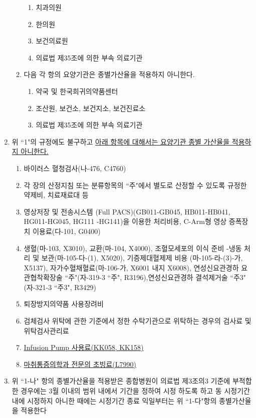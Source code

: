 \begin{enumerate}[1.]
\begin{enumerate}[가.]
\begin{enumerate}[(1)]
		\item 치과의원
		\item 한의원
		\item 보건의료원
		\item 의료법 제35조에 의한 부속 의료기관
		\end{enumerate}		
	\item 다음 각 항의 요양기관은 종별가산율을 적용하지 아니한다.
		\begin{enumerate}[(1)]\tightlist
		\item 약국 및 한국희귀의약품센터 
		\item 조산원, 보건소, 보건지소, 보건진료소
		\item 의료법 제35조에 의한 부속 의료기관
		\end{enumerate}
	\end{enumerate}
\item 위 “1"의 규정에도 불구하고 \uline{아래 항목에 대해서는 요양기관 종별 가산율을 적용하지 아니한다.}
	\begin{enumerate}[가.]\tightlist
	\item 바이러스 혈청검사(나-476, C4760)
	\item 각 장의 산정지침 또는 분류항목의 “주"에서 별도로 산정할 수 있도록 규정한 약제비, 치료재료대 등
	\item 영상저장 및 전송시스템 (Full PACS)(GB011-GB045, HB011-HB041, HG011-HG045, HG111 -HG141)을 이용한 처리비용, C-Arm형 영상 증폭장치 이용료(다-101, G0400)
	\item 생혈(마-103, X3010), 교환(마-104, X4000), 조혈모세포의 이식 준비 -냉동 처리 및 보관(마-105-다-(1), X5020), 기증제대혈제제 비용 (마-105-라-(3)-가, X5137), 자가수혈채혈료(마-106-가, X6001 내지
X6008), 연성신요관경하 요관협착확장술 “주"(자-319-3 “주", R3196),연성신요관경하 결석제거술 “주3"(자-321-3 “주3", R3429)
	\item 퇴장방지의약품 사용장려비
	\item 검체검사 위탁에 관한 기준에서 정한 수탁기관으로 위탁하는 경우의
검사료 및 위탁검사관리료
	\item \uline{Infusion Pump 사용료(KK058, KK158)}
	\item \uline{마취통증의학과 전문의 초빙료(L7990)}
	\end{enumerate}
\item 위 “1-나" 항의 종별가산율을 적용받은 종합병원이 의료법 제3조의3 기준에 부적합한 경우에는 3월 이내의 범위 내에서 기간을 정하여 시정 하도록 하고 동 시정기간 내에 시정하지 아니한 때에는 시정기간 종료 익일부터는 위 “1-다"항의 종별가산율을 적용한다
\end{enumerate}

